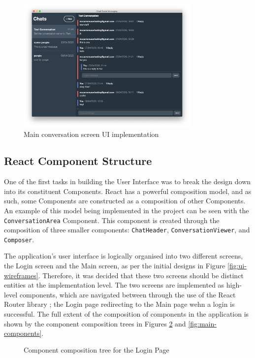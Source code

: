 \begin{figure}[h!]
  \centering
  \includegraphics[width=0.8\textwidth]{images/implementation-main.png}
  \caption{Main conversation screen UI implementation}
  \label{fig:login-ui}
\end{figure}

\subsection{React Component Structure}
One of the first tasks in building the User Interface was to break the design down into its constituent Components. React has a powerful composition model, and as such, some Components are constructed as a composition of other Components. An example of this model being implemented in the project can be seen with the \verb|ConversationArea| Component. This component is created through the composition of three smaller components: \verb|ChatHeader|, \verb|ConversationViewer|, and \verb|Composer|.

The application's user interface is logically organised into two different screens, the Login screen and the Main screen, as per the initial designs in Figure \ref{fig:ui-wireframes}. Therefore, it was decided that these two screens should be distinct entities at the implementation level. The two screens are implemented as high-level components, which are navigated between through the use of the React Router library \cite{react-router}; the Login page redirecting to the Main page wehn a login is successful. The full extent of the composition of components in the application is shown by the component composition trees in Figures \ref{fig:login-components} and \ref{fig:main-components}.

\begin{figure}[h!]
  \begin{center}
    \caption{Component composition tree for the Login Page}
    \label{fig:login-components}
  \end{center}
\end{figure}

